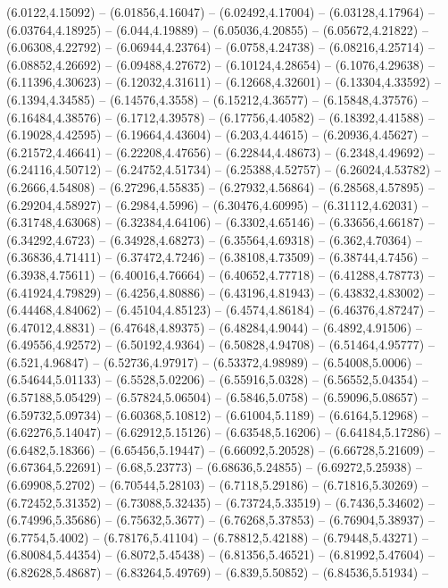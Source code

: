 {(6.0122,4.15092) -- (6.01856,4.16047) -- (6.02492,4.17004) -- (6.03128,4.17964) -- (6.03764,4.18925) -- (6.044,4.19889) -- (6.05036,4.20855) -- (6.05672,4.21822) -- (6.06308,4.22792) -- (6.06944,4.23764) -- (6.0758,4.24738) -- (6.08216,4.25714) --
(6.08852,4.26692) -- (6.09488,4.27672) -- (6.10124,4.28654) -- (6.1076,4.29638) -- (6.11396,4.30623) -- (6.12032,4.31611) -- (6.12668,4.32601) -- (6.13304,4.33592) -- (6.1394,4.34585) -- (6.14576,4.3558) -- (6.15212,4.36577) -- (6.15848,4.37576) --
(6.16484,4.38576) -- (6.1712,4.39578) -- (6.17756,4.40582) -- (6.18392,4.41588) -- (6.19028,4.42595) -- (6.19664,4.43604) -- (6.203,4.44615) -- (6.20936,4.45627) -- (6.21572,4.46641) -- (6.22208,4.47656) -- (6.22844,4.48673) -- (6.2348,4.49692) --
(6.24116,4.50712) -- (6.24752,4.51734) -- (6.25388,4.52757) -- (6.26024,4.53782) -- (6.2666,4.54808) -- (6.27296,4.55835) -- (6.27932,4.56864) -- (6.28568,4.57895) -- (6.29204,4.58927) -- (6.2984,4.5996) -- (6.30476,4.60995) -- (6.31112,4.62031) --
(6.31748,4.63068) -- (6.32384,4.64106) -- (6.3302,4.65146) -- (6.33656,4.66187) -- (6.34292,4.6723) -- (6.34928,4.68273) -- (6.35564,4.69318) -- (6.362,4.70364) -- (6.36836,4.71411) -- (6.37472,4.7246) -- (6.38108,4.73509) -- (6.38744,4.7456) --
(6.3938,4.75611) -- (6.40016,4.76664) -- (6.40652,4.77718) -- (6.41288,4.78773) -- (6.41924,4.79829) -- (6.4256,4.80886) -- (6.43196,4.81943) -- (6.43832,4.83002) -- (6.44468,4.84062) -- (6.45104,4.85123) -- (6.4574,4.86184) -- (6.46376,4.87247) --
(6.47012,4.8831) -- (6.47648,4.89375) -- (6.48284,4.9044) -- (6.4892,4.91506) -- (6.49556,4.92572) -- (6.50192,4.9364) -- (6.50828,4.94708) -- (6.51464,4.95777) -- (6.521,4.96847) -- (6.52736,4.97917) -- (6.53372,4.98989) -- (6.54008,5.0006) --
(6.54644,5.01133) -- (6.5528,5.02206) -- (6.55916,5.0328) -- (6.56552,5.04354) -- (6.57188,5.05429) -- (6.57824,5.06504) -- (6.5846,5.0758) -- (6.59096,5.08657) -- (6.59732,5.09734) -- (6.60368,5.10812) -- (6.61004,5.1189) -- (6.6164,5.12968) --
(6.62276,5.14047) -- (6.62912,5.15126) -- (6.63548,5.16206) -- (6.64184,5.17286) -- (6.6482,5.18366) -- (6.65456,5.19447) -- (6.66092,5.20528) -- (6.66728,5.21609) -- (6.67364,5.22691) -- (6.68,5.23773) -- (6.68636,5.24855) -- (6.69272,5.25938) --
(6.69908,5.2702) -- (6.70544,5.28103) -- (6.7118,5.29186) -- (6.71816,5.30269) -- (6.72452,5.31352) -- (6.73088,5.32435) -- (6.73724,5.33519) -- (6.7436,5.34602) -- (6.74996,5.35686) -- (6.75632,5.3677) -- (6.76268,5.37853) -- (6.76904,5.38937) --
(6.7754,5.4002) -- (6.78176,5.41104) -- (6.78812,5.42188) -- (6.79448,5.43271) -- (6.80084,5.44354) -- (6.8072,5.45438) -- (6.81356,5.46521) -- (6.81992,5.47604) -- (6.82628,5.48687) -- (6.83264,5.49769) -- (6.839,5.50852) -- (6.84536,5.51934) --
}
